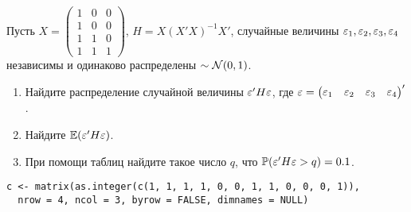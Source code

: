 \begin{problem}

Пусть $X = \begin{pmatrix} 1 & 0 & 0 \\ 1 & 0 & 0 \\ 1 & 1 & 0  \\ 1 & 1 & 1 \end{pmatrix} $, $H = X(X'X)^{-1}X'$, случайные величины $\varepsilon_1, \varepsilon_2, \varepsilon_3, \varepsilon_4$ независимы и одинаково распределены $\sim \mathcal{N} (0,1)$.
\begin{enumerate}
\item Найдите распределение случайной величины $\varepsilon'H\varepsilon$, где $\varepsilon = \begin{pmatrix} \varepsilon_1 & \varepsilon_2 & \varepsilon_3 & \varepsilon_4 \end{pmatrix}'$.
\item Найдите $\mathbb{E}(\varepsilon'H\varepsilon)$.
\item При помощи таблиц найдите такое число $q$, что $\mathbb{P}(\varepsilon'H\varepsilon > q)=0.1$.
\end{enumerate}


\begin{sol}

\begin{verbatim}
c <- matrix(as.integer(c(1, 1, 1, 1, 0, 0, 1, 1, 0, 0, 0, 1)),
  nrow = 4, ncol = 3, byrow = FALSE, dimnames = NULL)
\end{verbatim}
\end{sol}
\end{problem}


